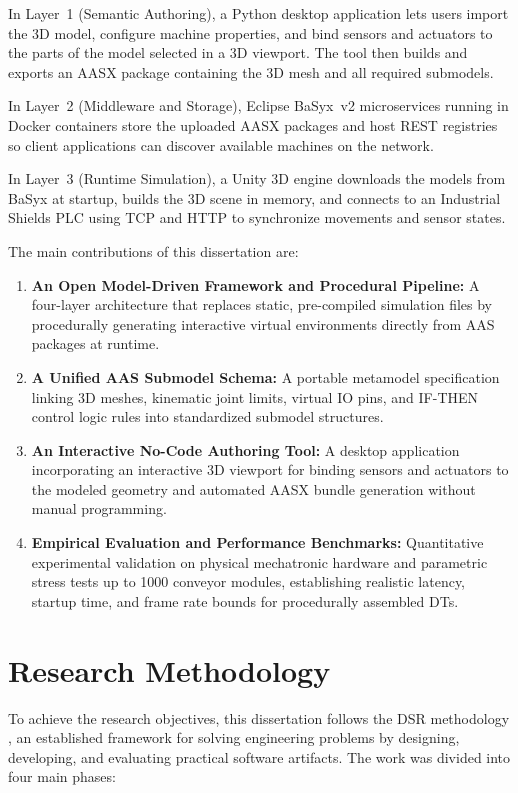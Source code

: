 In Layer~1 (Semantic Authoring), a Python desktop application lets users import the 3D model, configure machine properties, and bind sensors and actuators to the parts of the model selected in a 3D viewport. The tool then builds and exports an \gls{AASX} package containing the 3D mesh and all required submodels.

In Layer~2 (Middleware and Storage), Eclipse BaSyx~v2 microservices running in Docker containers store the uploaded \gls{AASX} packages and host \gls{REST} registries so client applications can discover available machines on the network.

In Layer~3 (Runtime Simulation), a Unity 3D engine downloads the models from BaSyx at startup, builds the 3D scene in memory, and connects to an Industrial Shields \gls{PLC} using \gls{TCP} and \gls{HTTP} to synchronize movements and sensor states.

The main contributions of this dissertation are:
\begin{enumerate}
    \item \textbf{An Open Model-Driven Framework and Procedural Pipeline:} A four-layer architecture that replaces static, pre-compiled simulation files by procedurally generating interactive virtual environments directly from \gls{AAS} packages at runtime.
    \item \textbf{A Unified \gls{AAS} Submodel Schema:} A portable metamodel specification linking 3D meshes, kinematic joint limits, virtual \gls{IO} pins, and IF-THEN control logic rules into standardized submodel structures.
    \item \textbf{An Interactive No-Code Authoring Tool:} A desktop application incorporating an interactive 3D viewport for binding sensors and actuators to the modeled geometry and automated \gls{AASX} bundle generation without manual programming.
    \item \textbf{Empirical Evaluation and Performance Benchmarks:} Quantitative experimental validation on physical mechatronic hardware and parametric stress tests up to 1000 conveyor modules, establishing realistic latency, startup time, and frame rate bounds for procedurally assembled \glspl{DT}.
\end{enumerate}

\section{Research Methodology}
\label{sec:methodology}

To achieve the research objectives, this dissertation follows the \gls{DSR} methodology \cite{Peffers2007}, an established framework for solving engineering problems by designing, developing, and evaluating practical software artifacts. The work was divided into four main phases:

